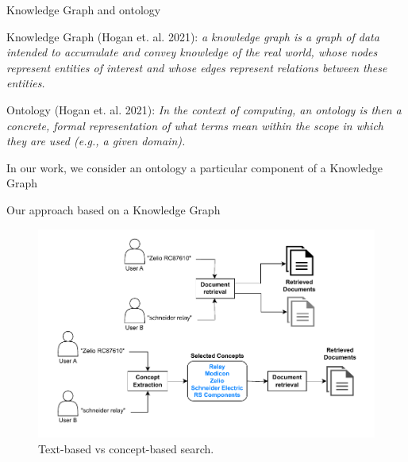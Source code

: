 \begin{frame}{Knowledge Graph and ontology}

    Knowledge Graph (Hogan et. al. 2021):
    \emph{a knowledge graph is a graph of data intended to accumulate and convey knowledge of the real world, whose nodes represent entities of interest and whose edges represent relations between these entities.}
    
    Ontology (Hogan et. al. 2021):
    \emph{In the context of computing, an ontology is then a concrete, formal representation of what terms mean within the scope in which they are used (e.g., a given domain).}

    \begin{center}
        In our work, we consider an ontology a particular component of a Knowledge Graph
    \end{center}
    
\end{frame}

\begin{frame}{Our approach based on a Knowledge Graph}

    \begin{figure} [H]
        \begin{center}
            \includegraphics[scale=0.6]{images/text-vs-concept-based-search.pdf} 
            \caption{Text-based vs concept-based search.} 
        \end{center}
    \end{figure}

\end{frame}
